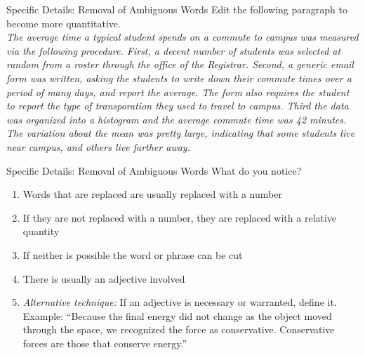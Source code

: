 \documentclass{beamer}
\begin{document}
\begin{frame}{Specific Details: Removal of Ambiguous Words}
\small
\alert{Edit the following paragraph to become more quantitative}. \\ \vspace{0.3cm}
\textit{The average time a typical student spends on a commute to campus was measured via the following procedure.  First, a decent number of students was selected at random from a roster through the office of the Registrar.  Second, a generic email form was written, asking the students to write down their commute times over a period of many days, and report the average.  The form also requires the student to report the type of transporation they used to travel to campus.  Third the data was organized into a histogram and the average commute time was 42 minutes.  The variation about the mean was pretty large, indicating that some students live near campus, and others live farther away.}
\end{frame}

\begin{frame}{Specific Details: Removal of Ambiguous Words}
What do you notice?
\begin{enumerate}
\item Words that are replaced are usually replaced with a number
\item If they are not replaced with a number, they are replaced with a relative quantity
\item If neither is possible the word or phrase can be cut
\item There is usually an adjective involved
\item \textit{Alternative technique:} If an adjective is necessary or warranted, define it.  Example: ``Because the final energy did not change as the object moved through the space, we recognized the force as conservative.  Conservative forces are those that conserve energy.''
\end{enumerate}
\end{frame}
\end{document}
